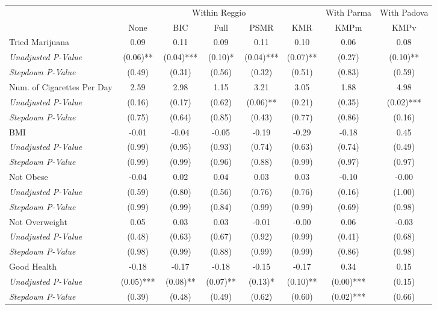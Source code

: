 \begin{tabular}{l c c c c c c c}
\toprule
& \multicolumn{5}{c}{Within Reggio} & With Parma & With Padova \\\cmidrule(lr){2-6} \cmidrule(lr){7-7} \cmidrule(lr){8-8}
 & None & BIC & Full & PSMR & KMR & KMPm & KMPv \\
\midrule
Tried Marijuana & 0.09 & 0.11 & 0.09 & 0.11 & 0.10 & 0.06 & 0.08 \\
\quad \textit{Unadjusted P-Value} & (0.06)** & (0.04)*** & (0.10)* & (0.04)*** & (0.07)** & (0.27) & (0.10)** \\
\quad \textit{Stepdown P-Value} & (0.49) & (0.31) & (0.56) & (0.32) & (0.51) & (0.83) & (0.59) \\
Num. of Cigarettes Per Day & 2.59 & 2.98 & 1.15 & 3.21 & 3.05 & 1.88 & 4.98 \\
\quad \textit{Unadjusted P-Value} & (0.16) & (0.17) & (0.62) & (0.06)** & (0.21) & (0.35) & (0.02)*** \\
\quad \textit{Stepdown P-Value} & (0.75) & (0.64) & (0.85) & (0.43) & (0.77) & (0.86) & (0.16) \\
BMI & -0.01 & -0.04 & -0.05 & -0.19 & -0.29 & -0.18 & 0.45 \\
\quad \textit{Unadjusted P-Value} & (0.99) & (0.95) & (0.93) & (0.74) & (0.63) & (0.74) & (0.49) \\
\quad \textit{Stepdown P-Value} & (0.99) & (0.99) & (0.96) & (0.88) & (0.99) & (0.97) & (0.97) \\
Not Obese & -0.04 & 0.02 & 0.04 & 0.03 & 0.03 & -0.10 & -0.00 \\
\quad \textit{Unadjusted P-Value} & (0.59) & (0.80) & (0.56) & (0.76) & (0.76) & (0.16) & (1.00) \\
\quad \textit{Stepdown P-Value} & (0.99) & (0.99) & (0.84) & (0.99) & (0.99) & (0.69) & (0.98) \\
Not Overweight & 0.05 & 0.03 & 0.03 & -0.01 & -0.00 & 0.06 & -0.03 \\
\quad \textit{Unadjusted P-Value} & (0.48) & (0.63) & (0.67) & (0.92) & (0.99) & (0.41) & (0.68) \\
\quad \textit{Stepdown P-Value} & (0.98) & (0.99) & (0.88) & (0.99) & (0.99) & (0.86) & (0.98) \\
Good Health & -0.18 & -0.17 & -0.18 & -0.15 & -0.17 & 0.34 & 0.15 \\
\quad \textit{Unadjusted P-Value} & (0.05)*** & (0.08)** & (0.07)** & (0.13)* & (0.10)** & (0.00)*** & (0.15) \\
\quad \textit{Stepdown P-Value} & (0.39) & (0.48) & (0.49) & (0.62) & (0.60) & (0.02)*** & (0.66) \\

\end{tabular}
